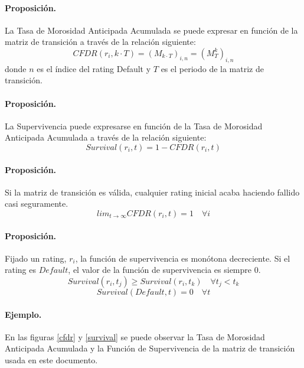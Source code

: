 \paragraph{Proposici\'on.} La Tasa de Morosidad Anticipada Acumulada se 
puede expresar en funci\'on de la matriz de transici\'on a trav\'es de la
relaci\'on siguiente:
\begin{equation}
CFDR(r_i,k \cdot T) = (M_{k \cdot T})_{i,n} = (M_{T}^{k})_{i,n}
\label{eq:cdfr1}
\end{equation}
donde $n$ es el \'indice del rating Default y $T$ es el periodo de la matriz
de transici\'on.

\paragraph{Proposici\'on.} La Supervivencia puede expresarse en funci\'on de
la Tasa de Morosidad Anticipada Acumulada a trav\'es de la relaci\'on siguiente:
\begin{equation}
Survival(r_i, t) =  1 - CFDR(r_i, t)
\label{eq:survival1}
\end{equation}

\paragraph{Proposici\'on.} Si la matriz de transici\'on es v\'alida, cualquier 
rating inicial acaba haciendo fallido casi seguramente.
\begin{equation}
lim_{t \to \infty} CFDR(r_i, t) =  1 \quad \forall i
\end{equation}

\paragraph{Proposici\'on.} Fijado un rating, $r_i$, la funci\'on de 
supervivencia es mon\'otona decreciente. Si el rating es $Default$,
el valor de la funci\'on de supervivencia es siempre $0$.
\begin{equation}
\label{prop:survival1}
Survival(r_i, t_j) \ge Survival(r_i, t_k) \quad \forall t_j < t_k
\end{equation}
\begin{equation}
\label{prop:survival2}
Survival(Default, t) = 0 \quad \forall t
\end{equation}

\paragraph{Ejemplo.} En las figuras \ref{cfdr} y \ref{survival} se puede observar
la Tasa de Morosidad Anticipada Acumulada y la Funci\'on de Supervivencia de la matriz
de transici\'on usada en este documento.

